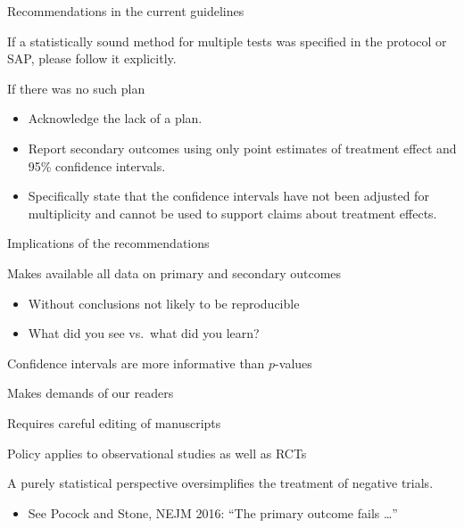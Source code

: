 \documentclass[ignorenonframetext,]{beamer}
\providecommand{\tightlist}{%
  \setlength{\itemsep}{0pt}\setlength{\parskip}{0pt}}
\begin{document}
\begin{frame}{Recommendations in the current guidelines}
\protect\hypertarget{recommendations-in-the-current-guidelines}{}

If a statistically sound method for multiple tests was specified in the
protocol or SAP, please follow it explicitly.

If there was no such plan

\begin{itemize}
\item
  Acknowledge the lack of a plan.
\item
  Report secondary outcomes using only point estimates of treatment
  effect and 95\% confidence intervals.
\item
  Specifically state that the confidence intervals have not been
  adjusted for multiplicity and cannot be used to support claims about
  treatment effects.
\end{itemize}

\end{frame}

\begin{frame}{Implications of the recommendations}
\protect\hypertarget{implications-of-the-recommendations}{}

Makes available all data on primary and secondary outcomes

\begin{itemize}
\item
  Without conclusions not likely to be reproducible
\item
  What did you see vs.~what did you learn?
\end{itemize}

Confidence intervals are more informative than \(p\)-values

Makes demands of our readers

Requires careful editing of manuscripts

Policy applies to observational studies as well as RCTs

A purely statistical perspective oversimplifies the treatment of
negative trials.

\begin{itemize}
\tightlist
\item
  See Pocock and Stone, NEJM 2016: ``The primary outcome fails \ldots''
\end{itemize}

\end{frame}
\end{document}
